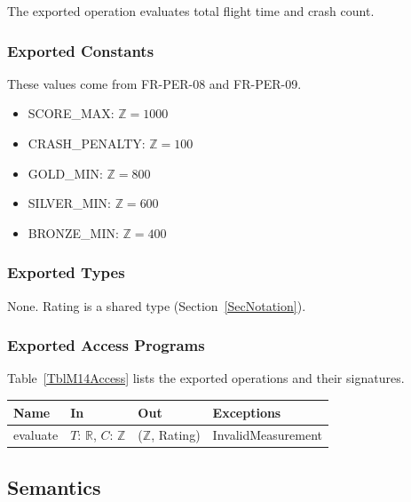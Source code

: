 \documentclass[12pt, titlepage]{article}
\begin{document}
The exported operation evaluates total flight time and crash count.

\subsubsection{Exported Constants}

These values come from FR-PER-08 and FR-PER-09.

\begin{itemize}
\item SCORE\_MAX: $\mathbb{Z} = 1000$
\item CRASH\_PENALTY: $\mathbb{Z} = 100$
\item GOLD\_MIN: $\mathbb{Z} = 800$
\item SILVER\_MIN: $\mathbb{Z} = 600$
\item BRONZE\_MIN: $\mathbb{Z} = 400$
\end{itemize}

\subsubsection{Exported Types}

None. Rating is a shared type (Section~\ref{SecNotation}).

\subsubsection{Exported Access Programs}

Table~\ref{TblM14Access} lists the exported operations and their signatures.

\begin{center}
\begin{minipage}{\textwidth}
\begin{tabularx}{\textwidth}{p{2.4cm} p{3.6cm} p{3cm} X}
\toprule
\textbf{Name} & \textbf{In} & \textbf{Out} & \textbf{Exceptions} \\
\midrule
evaluate & $T$: $\mathbb{R}$, $C$: $\mathbb{Z}$ & ($\mathbb{Z}$, Rating) &
InvalidMeasurement \\
\bottomrule
\end{tabularx}
\label{TblM14Access}
\end{minipage}
\end{center}

\subsection{Semantics}
\end{document}
